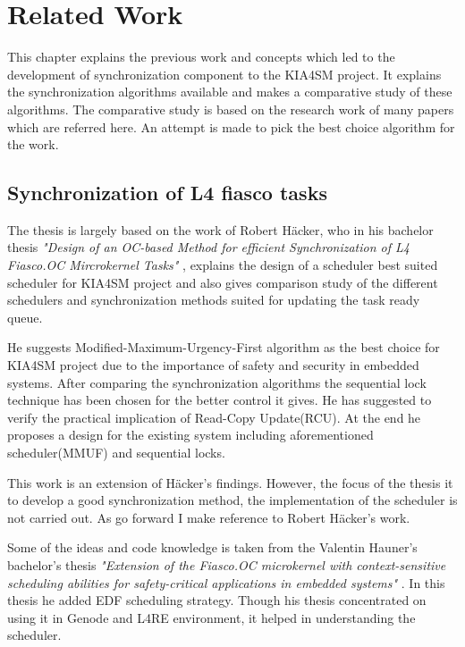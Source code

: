 \chapter{Related Work}
This chapter explains the previous work and concepts which led to the development of synchronization component to the KIA4SM project. 
It explains the synchronization algorithms available and makes a comparative study of these algorithms. 
The comparative study is based on the research work of many papers which are referred here. An attempt is made to pick the best choice algorithm for the work. 

\section{Synchronization of L4 fiasco tasks}

The thesis is largely based on the work of Robert H{\"a}cker, who in his bachelor thesis \textit{ "Design of an OC-based Method for efficient Synchronization of L4 Fiasco.OC Mircrokernel Tasks"} \cite{haecker}, explains the design of a scheduler best suited scheduler for KIA4SM project and also gives comparison study of the different schedulers and synchronization methods suited for updating the task ready queue. 

He suggests Modified-Maximum-Urgency-First algorithm as the best choice for KIA4SM project due to the importance of safety and security in embedded systems. After comparing the synchronization algorithms the sequential lock technique has been chosen for the better control it gives. He has suggested to verify the practical implication of Read-Copy Update(RCU). At the end he proposes a design for the existing system including aforementioned  scheduler(MMUF) and sequential locks. 

This work is an extension of H{\"a}cker's findings. However, the focus of the thesis it to develop a good synchronization method, the implementation of the scheduler is not carried out. As go forward I make reference to Robert H{\"a}cker's work. 

Some of the ideas and code knowledge is taken from the Valentin Hauner's bachelor's thesis \textit{"Extension of the Fiasco.OC microkernel with context-sensitive
scheduling abilities for safety-critical applications in embedded systems"} \cite{hauner}. In this thesis he added EDF scheduling strategy. Though his thesis concentrated on using it in Genode and L4RE environment, it helped in understanding the scheduler.

